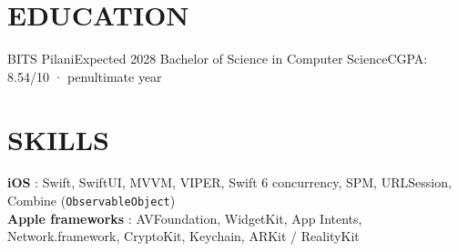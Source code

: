 \section{EDUCATION}
  \resumeSubHeadingListStart
    \resumeSubheading
      {BITS Pilani}{Expected 2028}
      {Bachelor of Science in Computer Science}{CGPA: 8.54/10 · penultimate year}
  \resumeSubHeadingListEnd

\section{SKILLS}
 \begin{itemize}[leftmargin=0in, label={}]
    \small{\item{
     \textbf{iOS} {: Swift, SwiftUI, MVVM, VIPER, Swift 6 concurrency, SPM, URLSession, Combine (\texttt{ObservableObject})} \vspace{1pt} \\
     \textbf{Apple frameworks} {: AVFoundation, WidgetKit, App Intents, Network.framework, CryptoKit, Keychain, ARKit / RealityKit}
    }}
 \end{itemize}



